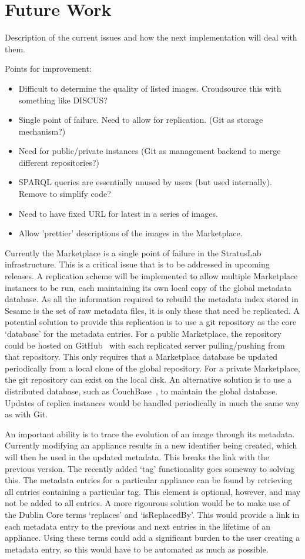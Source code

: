 \section{Future Work}

Description of the current issues and how the next implementation will
deal with them. 

Points for improvement:
\begin{itemize}
\item Difficult to determine the quality of listed images.  Croudsource
  this with something like DISCUS?
\item Single point of failure.  Need to allow for replication.  (Git as
  storage mechanism?)
\item Need for public/private instances (Git as management backend to
  merge different repositories?)
\item SPARQL queries are essentially unused by users (but used
  internally).  Remove to simplify code?
\item Need to have fixed URL for latest in a series of images.
\item Allow 'prettier' descriptions of the images in the Marketplace.
\end{itemize}

Currently the Marketplace is a single point of failure in the StratusLab infrastructure. This is 
a critical issue that is to be addressed in upcoming releases. A replication scheme will be 
implemented to allow multiple Marketplace instances to be run, each maintaining its own local
copy of the global metadata database. As all the information required to rebuild the metadata index
stored in Sesame is the set of raw metadata files, it is only these that need be replicated. A potential solution 
to provide this replication is to use a git repository as the core `database' for the metadata entries.  
For a public Marketplace, the repository could be hosted on GitHub~\cite{github} with each replicated server 
pulling/pushing from that repository. This only requires that a Marketplace database be updated periodically 
from a local clone of the global repository.  For a private Marketplace, the git repository can exist on the local disk.
An alternative solution is to use a distributed database, such as CouchBase~\cite{couchbase}, to maintain the 
global database. Updates of replica instances would be handled periodically in much the same way as with Git.

An important ability is to trace the evolution of an image through its metadata. Currently modifying an appliance
results in a new identifier being created, which will then be used in the updated metadata. This 
breaks the link with the previous version. The recently added `tag' functionality goes someway to solving this.  
The metadata entries for a particular appliance can be found by retrieving all entries containing a particular tag. 
This element is optional, however, and may not be added to all entries. A more rigourous solution would be 
to make use of the Dublin Core terms `replaces' and `isReplacedBy'. This would provide a link in each metadata 
entry to the previous and next entries in the lifetime of an appliance. Using these terms could add a significant 
burden to the user creating a metadata entry, so this would have to be automated as much as possible.
